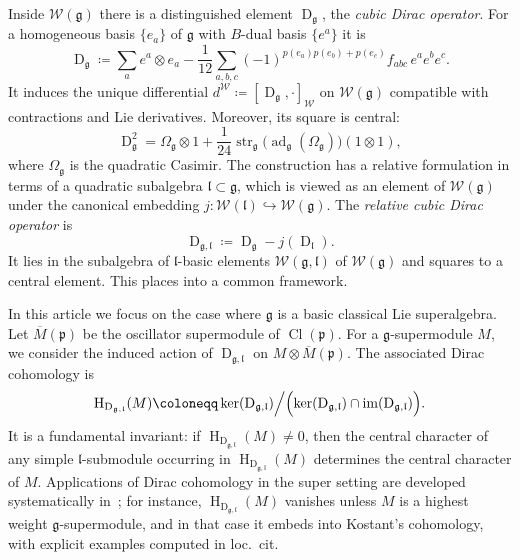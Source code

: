 \documentclass[11pt]{amsart}
\newcommand{\str}{\operatorname{str}}
\renewcommand{\Im}{\operatorname{im}}
\newcommand{\ad}{\operatorname{ad}}
\newcommand{\Dirac}{\operatorname{D}}
\def\WW{{\mathcal{W}}}
\def\Weil{{\mathcal{W}(\gg)}}
\def\Cl{{\operatorname{Cl}}}
\def\H{{\operatorname{H}}}
\def\ll{{\mathfrak l}}
\def\gg{{\mathfrak{g}}}
\theoremstyle{plain}
\theoremstyle{remark}
\theoremstyle{definition}
\numberwithin{equation}{section}
\theoremstyle{remark}
\begin{document}
Inside $\Weil$ there is a distinguished element $\Dirac_{\gg}$, the \emph{cubic Dirac operator}. For a homogeneous basis $\{e_a\}$ of $\gg$ with $B$-dual basis $\{e^a\}$ it is
\begin{equation}\label{eq:cubic-dirac}
\Dirac_{\gg}\coloneqq \sum_a e^a\otimes e_a-\frac{1}{12}\sum_{a,b,c}(-1)^{p(e_a)p(e_b)+p(e_c)}f_{abc}\,e^ae^be^c.
\end{equation}
It induces the unique differential
$
d^{\WW}\coloneqq [\Dirac_{\gg},\cdot]_{\WW}
$
on $\Weil$ compatible with contractions and Lie derivatives. Moreover, its square is central:
\begin{equation}\label{eq:dirac-square}
\Dirac_{\gg}^2=\Omega_{\gg}\otimes 1+\frac{1}{24}\str_{\gg}\!\bigl(\ad_{\gg}(\Omega_{\gg})\bigr)(1\otimes 1),
\end{equation}
where $\Omega_{\gg}$ is the quadratic Casimir. The construction has a relative formulation in terms of a quadratic subalgebra $\ll\subset\gg$, which is viewed as an element of $\Weil$ under the canonical embedding $j:\WW(\ll)\hookrightarrow\Weil$. The \emph{relative cubic Dirac operator} is
\begin{equation}
\Dirac_{\gg,\ll}\coloneqq \Dirac_{\gg}-j(\Dirac_{\ll}).
\end{equation}
It lies in the subalgebra of $\ll$-basic elements $\WW(\gg,\ll)$ of $\Weil$ and squares to a central element. This places \cite{Chen_Dirac_quadratic, Meyer} into a common framework.

In this article we focus on the case where $\gg$ is a basic classical Lie superalgebra.
Let $\overline{M}(\mathfrak{p})$ be the oscillator supermodule of $\Cl(\mathfrak{p})$.
For a $\gg$-supermodule $M$, we consider the induced action of
$\Dirac_{\gg,\ll}$ on $M\otimes \overline{M}(\mathfrak{p})$. The associated Dirac cohomology is
\begin{equation}
\H_{\Dirac_{\gg,\ll}}(M)
\coloneqq \ker(\Dirac_{\gg,\ll})
\Big/ \Bigl(\ker(\Dirac_{\gg,\ll})\cap \Im(\Dirac_{\gg,\ll})\Bigr).
\end{equation}
It is a fundamental invariant: if $\H_{\Dirac_{\gg,\ll}}(M)\neq 0$, then
the central character of any simple $\ll$-submodule occurring in
$\H_{\Dirac_{\gg,\ll}}(M)$ determines the central character of $M$.
Applications of Dirac cohomology in the super setting are developed systematically
in~\cite{Schmidt_Noja,SchmidtDirac}; for instance, $\H_{\Dirac_{\gg,\ll}}(M)$
vanishes unless $M$ is a highest weight $\gg$-supermodule, and in that case it
embeds into Kostant's cohomology, with explicit examples computed in loc.\ cit.
\end{document}
